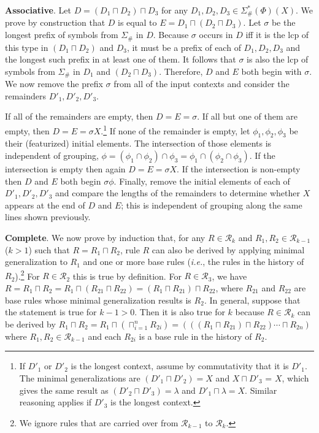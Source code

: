 \documentclass[11pt]{article}
\begin{document}
\textbf{Associative}. Let $D = (D_1 \sqcap D_2) \sqcap D_3$ for any $D_1, D_2, D_3 \in \Sigma_{\#}^*(\Phi)(X)$. We prove by construction that $D$ is equal to $E = D_1 \sqcap (D_2 \sqcap D_3)$. Let $\sigma$ be the longest prefix of symbols from $\Sigma_{\#}$ in $D$. Because $\sigma$ occurs in $D$ iff it is the lcp of this type in $(D_1 \sqcap D_2)$ and $D_3$, it must be a prefix of each of $D_1, D_2, D_3$ and the longest such prefix in at least one of them. It follows that $\sigma$ is also the lcp of symbols from $\Sigma_{\#}$ in $D_1$ and $(D_2 \sqcap D_3)$. Therefore, $D$ and $E$ both begin with $\sigma$. We now remove the prefix $\sigma$ from all of the input contexts and consider the remainders $D'_1, D'_2, D'_3$.

If all of the remainders are empty, then $D = E = \sigma$. If all but one of them are empty, then $D = E = \sigma X$.\footnote{If $D'_1$ or $D'_2$ is the longest context, assume by commutativity that it is $D'_1$. The minimal generalizations are $(D'_1 \sqcap D'_2) = X$ and $X \sqcap D'_3$ = $X$, which gives the same result as $(D'_2 \sqcap D'_3) = \lambda$ and $D'_1 \sqcap \lambda = X$. Similar reasoning applies if $D'_3$ is the longest context.} If none of the remainder is empty, let $\phi_1, \phi_2, \phi_3$ be their (featurized) initial elements. The intersection of those elements is independent of grouping, $\phi = (\phi_1 \cap \phi_2) \cap \phi_3 = \phi_1 \cap (\phi_2 \cap \phi_3)$. If the intersection is empty then again $D = E = \sigma X$. If the intersection is non-empty then $D$ and $E$ both begin $\sigma\phi$. Finally, remove the initial elements of each of $D'_1, D'_2, D'_3$ and compare the lengths of the remainders to determine whether $X$ appears at the end of $D$ and $E$; this is independent of grouping along the same lines shown previously.

\textbf{Complete}. \qquad We now prove by induction that, for any $R \in \mathcal{R}_k$ and $R_1, R_2 \in \mathcal{R}_{k-1}$ ($k > 1$) such that $R = R_1 \sqcap R_2$, rule $R$ can also be derived by applying minimal generalization to $R_1$ and one or more base rules (\emph{i.e.}, the rules in the history of $R_2$).\footnote{We ignore rules that are carried over from $\mathcal{R}_{k-1}$ to $\mathcal{R}_{k}$.} For $R \in \mathcal{R}_2$ this is true by definition. For $R \in \mathcal{R}_3$, we have $R = R_1 \sqcap R_2 = R_1 \sqcap (R_{21} \sqcap R_{22}) = (R_1 \sqcap R_{21}) \sqcap R_{22}$, where $R_{21}$ and $R_{22}$ are base rules whose minimal generalization results is $R_2$. In general, suppose that the statement is true for $k-1 > 0$. Then it is also true for $k$ because $R \in \mathcal{R}_k$ can be derived by $R_1 \sqcap R_2 = R_1 \sqcap (\sqcap_{i=1}^{n} R_{2i}) = (((R_{1} \sqcap R_{21}) \sqcap R_{22}) \cdots \sqcap R_{2n})$ where $R_1, R_2 \in \mathcal{R}_{k-1}$ and each $R_{2i}$ is a base rule in the history of $R_2$.
\end{document}
